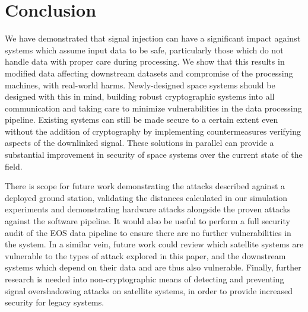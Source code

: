 \section{Conclusion}

We have demonstrated that signal injection can have a significant impact against systems which assume input data to be safe, particularly those which do not handle data with proper care during processing.
We show that this results in modified data affecting downstream datasets and compromise of the processing machines, with real-world harms.
Newly-designed space systems should be designed with this in mind, building robust cryptographic systems into all communication and taking care to minimize vulnerabilities in the data processing pipeline.
Existing systems can still be made secure to a certain extent even without the addition of cryptography by implementing countermeasures verifying aspects of the downlinked signal.
These solutions in parallel can provide a substantial improvement in security of space systems over the current state of the field.

There is scope for future work demonstrating the attacks described against a deployed ground station, validating the distances calculated in our simulation experiments and demonstrating hardware attacks alongside the proven attacks against the software pipeline.
It would also be useful to perform a full security audit of the EOS data pipeline to ensure there are no further vulnerabilities in the system.
In a similar vein, future work could review which satellite systems are vulnerable to the types of attack explored in this paper, and the downstream systems which depend on their data and are thus also vulnerable.
Finally, further research is needed into non-cryptographic means of detecting and preventing signal overshadowing attacks on satellite systems, in order to provide increased security for legacy systems.

%
%
